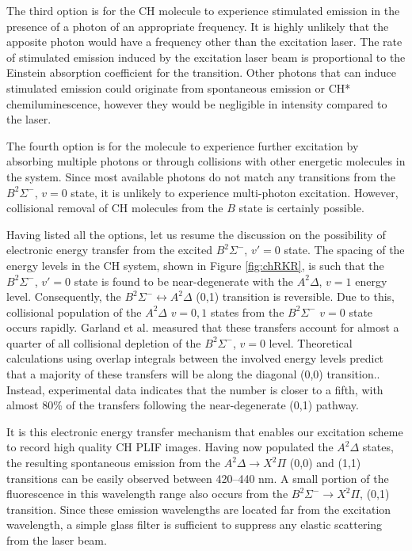 The third option is for the CH molecule to experience stimulated emission in the presence of a photon of an appropriate frequency.
It is highly unlikely that the apposite photon would have a frequency other than the excitation laser.
The rate of stimulated emission induced by the excitation laser beam is proportional to the Einstein absorption coefficient for the transition.
Other photons that can induce stimulated emission could originate from spontaneous emission or CH* chemiluminescence, however they would be negligible in intensity compared to the laser.

The fourth option is for the molecule to experience further excitation by absorbing multiple photons or through collisions with other energetic molecules in the system.
Since most available photons do not match any transitions from the \(B^2\Sigma^-\), \(v=0\) state, it is unlikely to experience multi-photon excitation.
However, collisional removal of CH molecules from the \(B\) state is certainly possible.

Having listed all the options, let us resume the discussion on the possibility of electronic energy transfer from the excited \(B^2\Sigma^-\), \(v'=0\) state.
The spacing of the energy levels in the CH system, shown in Figure \ref{fig:chRKR}, is such that the \(B^2\Sigma^-\), \(v'=0\) state is found to be near-degenerate with the \(A^2\Delta\), \(v=1\) energy level.
Consequently, the \(B^2\Sigma^-\leftrightarrow A^2\Delta\) (0,1) transition is reversible.
Due to this, collisional population of the \(A^2\Delta\) \(v=0,1\) states from the \(B^2\Sigma^-\) \(v=0\) state occurs rapidly.
Garland et al.\cite{1985-garland-b} measured that these transfers account for almost a quarter of all collisional depletion of the \(B^2\Sigma^-\), \(v=0\) level.
Theoretical calculations using overlap integrals between the involved energy levels predict that a majority of these transfers will be along the diagonal (0,0) transition.\cite{2000-luque}.
Instead, experimental data indicates that the number is closer to a fifth, with almost 80\% of the transfers following the near-degenerate (0,1) pathway.



It is this electronic energy transfer mechanism that enables our excitation scheme to record high quality CH PLIF images.
Having now populated the \(A^2\Delta\) states, the resulting spontaneous emission from the \(A^2\Delta\rightarrow X^2\Pi\) (0,0) and (1,1) transitions can be easily observed between 420--440 nm.
A small portion of the fluorescence in this wavelength range also occurs from the \(B^2\Sigma^-\rightarrow X^2\Pi\), (0,1) transition.
Since these emission wavelengths are located far from the excitation wavelength, a simple glass filter is sufficient to suppress any elastic scattering from the laser beam.

